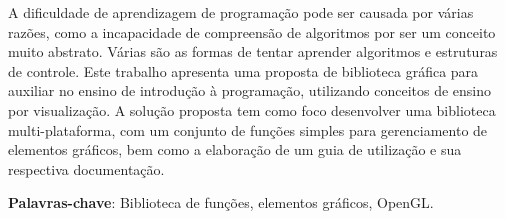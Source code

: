 \documentclass[12pt, %
openright,
oneside, %
a4paper,    %
brazil]{facom-ufu-abntex2}
\begin{document}







\begin{resumo} %
 A dificuldade de aprendizagem de programação pode ser causada por várias razões, como a incapacidade de compreensão de algoritmos por ser um conceito muito abstrato.
 Várias são as formas de tentar aprender algoritmos e estruturas de controle. Este trabalho apresenta uma proposta de biblioteca gráfica para auxiliar no ensino de introdução à programação, utilizando conceitos de ensino por visualização. A solução proposta tem como foco desenvolver uma biblioteca multi-plataforma, com um conjunto de funções simples para gerenciamento de elementos gráficos, bem como a elaboração de um guia de utilização e sua respectiva documentação.

 \vspace{\onelineskip}

 \noindent
 \textbf{Palavras-chave}: Biblioteca de funções, elementos gráficos, OpenGL. %
\end{resumo}

\listoffigures*
\cleardoublepage

\iffalse
\pdfbookmark[0]{\listtablename}{lot}
\listoftables*
\cleardoublepage
\fi
\end{document}
